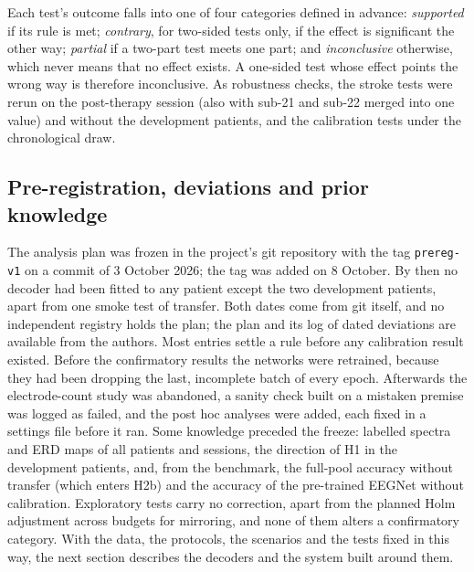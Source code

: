 Each test's outcome falls into one of four categories defined in advance: \emph{supported} if its
rule is met; \emph{contrary}, for two-sided tests only, if the effect is significant the other
way; \emph{partial} if a two-part test meets one part; and \emph{inconclusive} otherwise, which
never means that no effect exists. A one-sided test whose effect points the wrong way is
therefore inconclusive. As robustness checks, the stroke tests were rerun on the post-therapy
session (also with sub-21 and sub-22 merged into one value) and without the development
patients, and the calibration tests under the chronological draw.

\subsection{Pre-registration, deviations and prior knowledge}
\label{sec:prereg}
The analysis plan was frozen in the project's git repository with the tag \texttt{prereg-v1} on
a commit of 3 October 2026; the tag was added on 8 October. By then no decoder had been fitted to
any patient except the two development patients, apart from one smoke test of transfer. Both
dates come from git itself, and no independent registry holds the plan; the plan and its log of
\nDeviations{} dated deviations are available from the authors. Most entries settle a rule
before any calibration result existed. Before the confirmatory results the networks were
retrained, because they had been dropping the last, incomplete batch of every epoch. Afterwards
the electrode-count study was abandoned, a sanity check built on a mistaken premise was logged as
failed, and the post hoc analyses were added, each fixed in a settings file before it ran. Some
knowledge preceded the freeze: labelled spectra and ERD maps of all patients and sessions, the
direction of H1 in the development patients, and, from the benchmark, the full-pool accuracy
without transfer (which enters H2b) and the accuracy of the pre-trained EEGNet without
calibration. Exploratory tests carry no correction, apart from the planned Holm adjustment across
budgets for mirroring, and none of them alters a confirmatory category. With the data, the
protocols, the scenarios and the tests fixed in this way, the next section describes the decoders
and the system built around them.
